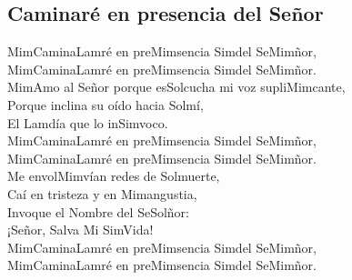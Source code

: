 \subsection{Caminaré en presencia del Señor}

\begin{center}

{\Large 
\ac{Mim}Camina\ac{Lam}ré en pre\ac{Mim}sencia \ac{Sim}del Se\ac{Mim}ñor,\\
\ac{Mim}Camina\ac{Lam}ré en pre\ac{Mim}sencia \ac{Sim}del Se\ac{Mim}ñor.\\
\vspace{1ex}
\ac{Mim}Amo al Señor porque es\ac{Sol}cucha mi voz supli\ac{Mim}cante,\\
Porque inclina su oído hacia \ac{Sol}mí,\\
El \ac{Lam}día que lo in\ac{Sim}voco.\\
\vspace{1ex}
\ac{Mim}Camina\ac{Lam}ré en pre\ac{Mim}sencia \ac{Sim}del Se\ac{Mim}ñor,\\
\ac{Mim}Camina\ac{Lam}ré en pre\ac{Mim}sencia \ac{Sim}del Se\ac{Mim}ñor.\\
\vspace{1ex}
Me envol\ac{Mim}vían redes de \ac{Sol}muerte,\\
Caí en tristeza y en \ac{Mim}angustia,\\
Invoque el Nombre del Se\ac{Sol}ñor:\\
¡Señor, Salva Mi \ac{Sim}Vida!\\
\vspace{1ex}
\ac{Mim}Camina\ac{Lam}ré en pre\ac{Mim}sencia \ac{Sim}del Se\ac{Mim}ñor,\\
\ac{Mim}Camina\ac{Lam}ré en pre\ac{Mim}sencia \ac{Sim}del Se\ac{Mim}ñor.\\
}

\end{center}